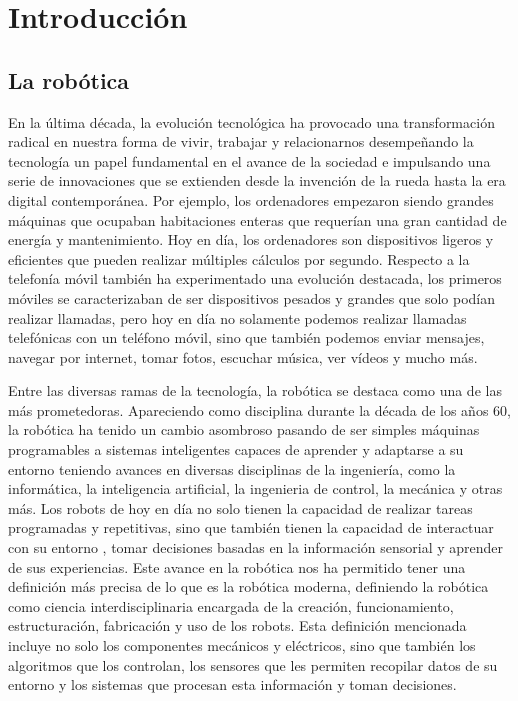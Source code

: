 \chapter{Introducción}
\label{cap:introduccion}
\setcounter{page}{1}
\section{La robótica}
\label{sec:enfoquesrobotica}
En la última década, la evolución tecnológica ha provocado una transformación radical en nuestra forma de vivir, trabajar y relacionarnos desempeñando la tecnología un papel 
fundamental en el avance de la sociedad e impulsando una serie de innovaciones que se extienden desde la invención de la rueda hasta la era digital contemporánea. 
Por ejemplo, los ordenadores empezaron siendo grandes máquinas que ocupaban habitaciones enteras que requerían una gran cantidad de energía y mantenimiento. Hoy en día, los ordenadores
son dispositivos ligeros y eficientes que pueden realizar múltiples cálculos por segundo. Respecto a la telefonía móvil también ha experimentado una evolución destacada, los primeros móviles
se caracterizaban de ser dispositivos pesados y grandes que solo podían realizar llamadas, pero hoy en día no solamente podemos realizar llamadas telefónicas con un teléfono móvil, sino 
que también podemos enviar mensajes, navegar por internet, tomar fotos, escuchar música, ver vídeos y mucho más. \newline

Entre las diversas ramas de la tecnología, la robótica se destaca como una de las más prometedoras. Apareciendo como disciplina durante la década de los años 60, 
la robótica ha tenido un cambio asombroso  pasando de ser simples máquinas programables a sistemas inteligentes capaces de aprender y adaptarse 
a su entorno teniendo avances en diversas disciplinas de la ingeniería, como la informática, la inteligencia artificial, la ingenieria de control, la mecánica y otras más. 
Los robots de hoy en día no solo tienen la capacidad de realizar tareas programadas y repetitivas, sino que también tienen la capacidad de interactuar con su entorno
, tomar decisiones basadas en la información sensorial y aprender de sus experiencias. Este avance en la robótica nos ha permitido tener una definición más precisa de lo que es 
la robótica moderna, definiendo la robótica como ciencia interdisciplinaria encargada de la creación, funcionamiento, estructuración, fabricación y uso de los robots. 
Esta definición mencionada incluye no solo los componentes mecánicos y eléctricos, sino que también los algoritmos que los controlan, los sensores que les permiten recopilar
datos de su entorno y los sistemas que procesan esta información y toman decisiones.

